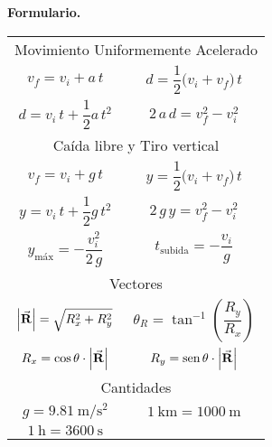 \documentclass[12pt, letter]{exam}
\begin{document}
\newpage

\textbf{\huge{Formulario.}}
\begin{table}[H]
    \centering
    \setlength{\tabcolsep}{40pt}
    \renewcommand{\arraystretch}{2.5}
    \begin{tabular}{c  c}
        \multicolumn{2}{c}{Movimiento Uniformemente Acelerado} \\
        $v_{f} = v_{i} + a \, t$ & $d = \dfrac{1}{2} \big( v_{i} + v_{f} \big) \, t$ \\
        $d = v_{i} \, t + \dfrac{1}{2} a \, t^{2}$ & $2 \, a \, d = v_{f}^{2} - v_{i}^{2}$ \\ \hline
        \multicolumn{2}{c}{Caída libre y Tiro vertical} \\
        $v_{f} = v_{i} + g \, t$ & $y = \dfrac{1}{2} \big( v_{i} + v_{f} \big) \, t$ \\
        $y = v_{i} \, t + \dfrac{1}{2} g \, t^{2}$ & $2 \, g \, y = v_{f}^{2} - v_{i}^{2}$ \\ 
        $y_{\text{máx}} = - \dfrac{v_{i}^{2}}{2 \, g}$ & $t_{\text{subida}} = - \dfrac{v_{i}}{g}$ \\ \hline
        \multicolumn{2}{c}{Vectores} \\
        $\abs{\va{R}} = \sqrt{R_{x}^{2} + R_{y}^{2}}$ & $\theta_{R} = \tan^{-1} \left( \dfrac{R_{y}}{R_{x}} \right)$ \\
        $R_{x} = \cos \theta \cdot \abs{\va{R}}$ & $R_{y} = \text{sen} \, \theta \cdot \abs{\va{R}}$ \\ \hline
        \multicolumn{2}{c}{Cantidades} \\
        $g = \SI{9.81}{\meter\per\square\second}$ & $\SI{1}{\kilo\meter} = \SI{1000}{\meter}$  \\
        $\SI{1}{\hour} = \SI{3600}{\second}$ &
\end{tabular}
\end{table}
\end{document}

